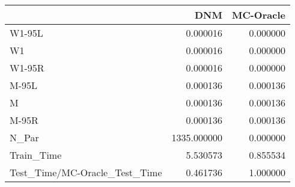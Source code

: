 \begin{tabular}{lrr}
\toprule
{} &          DNM &  MC-Oracle \\
\midrule
W1-95L                        &     0.000016 &   0.000000 \\
W1                            &     0.000016 &   0.000000 \\
W1-95R                        &     0.000016 &   0.000000 \\
M-95L                         &     0.000136 &   0.000136 \\
M                             &     0.000136 &   0.000136 \\
M-95R                         &     0.000136 &   0.000136 \\
N\_Par                         &  1335.000000 &   0.000000 \\
Train\_Time                    &     5.530573 &   0.855534 \\
Test\_Time/MC-Oracle\_Test\_Time &     0.461736 &   1.000000 \\
\bottomrule
\end{tabular}
